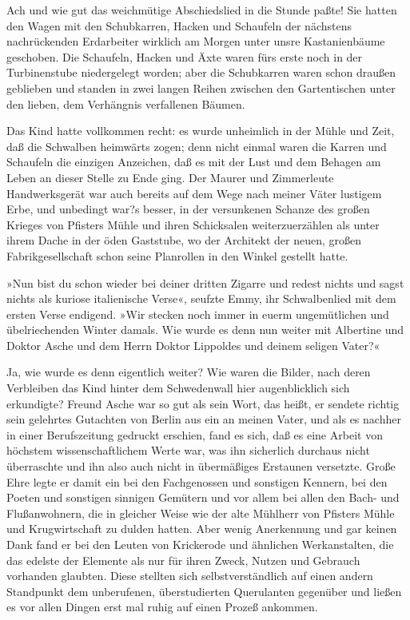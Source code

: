 Ach und wie gut das weichmütige Abschiedslied in die Stunde paßte!
Sie hatten den Wagen mit den Schubkarren, Hacken und Schaufeln der
nächstens nachrückenden Erdarbeiter wirklich am Morgen unter unsre
Kastanienbäume geschoben. Die Schaufeln, Hacken und Äxte waren fürs
erste noch in der Turbinenstube niedergelegt worden; aber die
Schubkarren waren schon draußen geblieben und standen in zwei
langen Reihen zwischen den Gartentischen unter den lieben, dem
Verhängnis verfallenen Bäumen.

Das Kind hatte vollkommen recht: es wurde unheimlich in der Mühle
und Zeit, daß die Schwalben heimwärts zogen; denn nicht einmal
waren die Karren und Schaufeln die einzigen Anzeichen, daß es mit
der Lust und dem Behagen am Leben an dieser Stelle zu Ende ging.
Der Maurer und Zimmerleute Handwerksgerät war auch bereits auf dem
Wege nach meiner Väter lustigem Erbe, und unbedingt war?s besser,
in der versunkenen Schanze des großen Krieges von Pfisters Mühle
und ihren Schicksalen weiterzuerzählen als unter ihrem Dache in der
öden Gaststube, wo der Architekt der neuen, großen
Fabrikgesellschaft schon seine Planrollen in den Winkel gestellt
hatte.

»Nun bist du schon wieder bei deiner dritten Zigarre und redest
nichts und sagst nichts als kuriose italienische Verse«, seufzte
Emmy, ihr Schwalbenlied mit dem ersten Verse endigend. »Wir stecken
noch immer in euerm ungemütlichen und übelriechenden Winter damals.
Wie wurde es denn nun weiter mit Albertine und Doktor Asche und dem
Herrn Doktor Lippoldes und deinem seligen Vater?«

Ja, wie wurde es denn eigentlich weiter? Wie waren die Bilder, nach
deren Verbleiben das Kind hinter dem Schwedenwall hier
augenblicklich sich erkundigte? Freund Asche war so gut als sein
Wort, das heißt, er sendete richtig sein gelehrtes Gutachten von
Berlin aus ein an meinen Vater, und als es nachher in einer
Berufszeitung gedruckt erschien, fand es sich, daß es eine Arbeit
von höchstem wissenschaftlichem Werte war, was ihn sicherlich
durchaus nicht überraschte und ihn also auch nicht in übermäßiges
Erstaunen versetzte. Große Ehre legte er damit ein bei den
Fachgenossen und sonstigen Kennern, bei den Poeten und sonstigen
sinnigen Gemütern und vor allem bei allen den Bach- und
Flußanwohnern, die in gleicher Weise wie der alte Mühlherr von
Pfisters Mühle und Krugwirtschaft zu dulden hatten. Aber wenig
Anerkennung und gar keinen Dank fand er bei den Leuten von
Krickerode und ähnlichen Werkanstalten, die das edelste der
Elemente als nur für ihren Zweck, Nutzen und Gebrauch vorhanden
glaubten. Diese stellten sich selbstverständlich auf einen andern
Standpunkt dem unberufenen, überstudierten Querulanten gegenüber
und ließen es vor allen Dingen erst mal ruhig auf einen Prozeß
ankommen.

